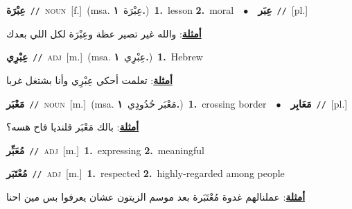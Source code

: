\documentclass[10pt,a4paper,twoside]{article} %
\begin{document}
\begin{multicols}{2}
{{{{{\setlength\topsep{0pt}\textbf{\foreignlanguage{arabic}{عِبْرَة}}\ {\color{gray}\texttt{//}\color{black}}\ \textsc{noun}\ [f.]\ \color{gray}(msa. \foreignlanguage{arabic}{عِبْرَة}~\foreignlanguage{arabic}{\textbf{١.}})\color{black}\ \textbf{1.}~lesson  \textbf{2.}~moral\ \ $\bullet$\ \ \setlength\topsep{0pt}\textbf{\foreignlanguage{arabic}{عِبَر}}\ {\color{gray}\texttt{//}\color{black}}\ [pl.]\  \begin{flushright}\color{gray}\foreignlanguage{arabic}{\textbf{\underline{\foreignlanguage{arabic}{أمثلة}}}: والله غير تصير عظة وعِبْرَة لكل اللي بعدك}\end{flushright}\color{black}} \vspace{2mm}

{\setlength\topsep{0pt}\textbf{\foreignlanguage{arabic}{عِبْرِي}}\ {\color{gray}\texttt{//}\color{black}}\ \textsc{adj}\ [m.]\ \color{gray}(msa. \foreignlanguage{arabic}{عِبْرِي}~\foreignlanguage{arabic}{\textbf{١.}})\color{black}\ \textbf{1.}~Hebrew\  \begin{flushright}\color{gray}\foreignlanguage{arabic}{\textbf{\underline{\foreignlanguage{arabic}{أمثلة}}}: تعلمت أحكي عِبْرِي وأنا بشتغل غربا}\end{flushright}\color{black}} \vspace{2mm}

{\setlength\topsep{0pt}\textbf{\foreignlanguage{arabic}{مَعْبَر}}\ {\color{gray}\texttt{//}\color{black}}\ \textsc{noun}\ [m.]\ \color{gray}(msa. \foreignlanguage{arabic}{مَعْبَر حُدُودِي}~\foreignlanguage{arabic}{\textbf{١.}})\color{black}\ \textbf{1.}~crossing border\ \ $\bullet$\ \ \setlength\topsep{0pt}\textbf{\foreignlanguage{arabic}{مَعَابِر}}\ {\color{gray}\texttt{//}\color{black}}\ [pl.]\  \begin{flushright}\color{gray}\foreignlanguage{arabic}{\textbf{\underline{\foreignlanguage{arabic}{أمثلة}}}: بالك مَعْبَر قلنديا فاح هسه؟}\end{flushright}\color{black}} \vspace{2mm}

{\setlength\topsep{0pt}\textbf{\foreignlanguage{arabic}{مُعَبِّر}}\ {\color{gray}\texttt{//}\color{black}}\ \textsc{adj}\ [m.]\ \textbf{1.}~expressing  \textbf{2.}~meaningful\ 

{\setlength\topsep{0pt}\textbf{\foreignlanguage{arabic}{مُعْتَبَر}}\ {\color{gray}\texttt{//}\color{black}}\ \textsc{adj}\ [m.]\ \textbf{1.}~respected  \textbf{2.}~highly-regarded among people\  \begin{flushright}\color{gray}\foreignlanguage{arabic}{\textbf{\underline{\foreignlanguage{arabic}{أمثلة}}}: عملنالهم غدوة مُعْتَبَرة بعد موسم الزيتون عشان يعرفوا بس مين احنا}\end{flushright}\color{black}} \vspace{2mm}

}}}}}
\end{multicols}
\end{document}
